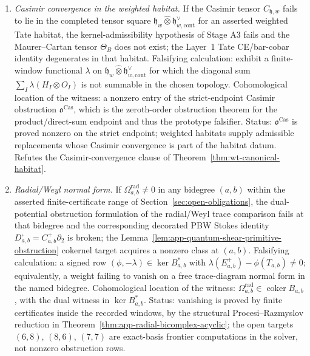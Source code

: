 \begin{enumerate}
\item[\((F3)\)] \emph{Casimir convergence in the weighted habitat.}
  If the Casimir tensor \(C_{\mathfrak h,w}\) fails to lie in the
  completed tensor square \(\mathfrak h_w\widehat\otimes
  \mathfrak h^\vee_{w,\mathrm{cont}}\) for an asserted weighted Tate
  habitat, the kernel-admissibility hypothesis of Stage A3 fails and
  the Maurer--Cartan tensor \(\Theta_B\) does not exist; the
  Layer~1 Tate CE/bar-cobar identity degenerates in that habitat.
  Falsifying calculation: exhibit a finite-window functional
  \(\lambda\) on \(\mathfrak h_w\widehat\otimes
  \mathfrak h^\vee_{w,\mathrm{cont}}\) for which the diagonal sum
  \(\sum_I\lambda(H_I\otimes O_I)\) is not summable in the chosen
  topology.
  Cohomological location of the witness: a nonzero entry of the
  strict-endpoint Casimir obstruction \(\mathfrak o^{\mathrm{Cas}}\),
  which is the zeroth-order obstruction theorem for the
  product/direct-sum endpoint and thus the prototype falsifier.
  Status: \(\mathfrak o^{\mathrm{Cas}}\) is proved nonzero on the
  strict endpoint; weighted habitats supply admissible replacements
  whose Casimir convergence is part of the habitat datum.  Refutes the
  Casimir-convergence clause of
  Theorem~\ref{thm:wt-canonical-habitat}.

\item[\((F4)\)] \emph{Radial/Weyl normal form.}
  If
  \(\Omega^{\mathrm{rad}}_{a,b}\ne0\) in any bidegree \((a,b)\) within
  the asserted finite-certificate range of
  Section~\ref{sec:open-obligations}, the dual-potential obstruction
  formulation of the radial/Weyl trace comparison fails at that
  bidegree and the corresponding decorated PBW Stokes identity
  \(D^\square_{a,b}=C^+_{a,b}\partial_2\) is broken; the
  Lemma~\ref{lem:app-quantum-shear-primitive-obstruction} cokernel
  target acquires a nonzero class at \((a,b)\).
  Falsifying calculation: a signed row
  \((\phi,-\lambda)\in\ker B_{a,b}^*\) with
  \(\lambda(E^+_{a,b})-\phi(T_{a,b})\ne0\); equivalently, a weight
  failing to vanish on a free trace-diagram normal form in the named
  bidegree.
  Cohomological location of the witness:
  \(\Omega^{\mathrm{rad}}_{a,b}\in\operatorname{coker}B_{a,b}\), with
  the dual witness in \(\ker B_{a,b}^*\).
  Status: vanishing is proved by finite certificates inside the
  recorded windows, by the structural Procesi--Razmyslov reduction
  in Theorem~\ref{thm:app-radial-bicomplex-acyclic}; the open targets
  \((6,8)\), \((8,6)\), \((7,7)\) are exact-basis frontier computations
  in the solver, not nonzero obstruction rows.


\end{enumerate}
